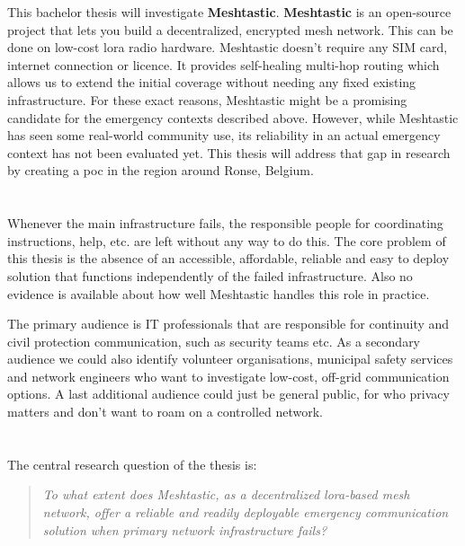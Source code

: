 This bachelor thesis will investigate \textbf{Meshtastic}. \textbf{Meshtastic} is an open-source project that lets you build a decentralized, encrypted mesh network. This can be done on low-cost \gls{lora} radio hardware.
Meshtastic doesn't require any SIM card, internet connection or licence. It provides self-healing multi-hop routing which allows us to extend the initial coverage without needing any fixed existing infrastructure.
For these exact reasons, Meshtastic might be a promising candidate for the emergency contexts described above.
However, while Meshtastic has seen some real-world community use, its reliability in an actual emergency context has not been evaluated yet. This thesis will address that gap in research by creating a \gls{poc} in the region around Ronse, Belgium.
\section{}%

\label{sec:probleemstelling}

Whenever the main infrastructure fails, the responsible people for coordinating instructions, help, etc. are left without any way to do this.
The core problem of this thesis is the absence of an accessible, affordable, reliable and easy to deploy solution that functions independently of the failed infrastructure.
Also no evidence is available about how well Meshtastic handles this role in practice.

The primary audience is IT professionals that are responsible for continuity and civil protection communication, such as security teams etc.
As a secondary audience we could also identify volunteer organisations, municipal safety services and network engineers who want to investigate low-cost, off-grid communication options.
A last additional audience could just be general public, for who privacy matters and don't want to roam on a controlled network.

\section{}%
\label{sec:onderzoeksvraag}

The central research question of the thesis is: 
\begin{quote}
\emph{To what extent does Meshtastic, as a decentralized \gls{lora}-based mesh network, offer a reliable and readily
deployable emergency communication solution when primary network infrastructure fails?}
\end{quote}

